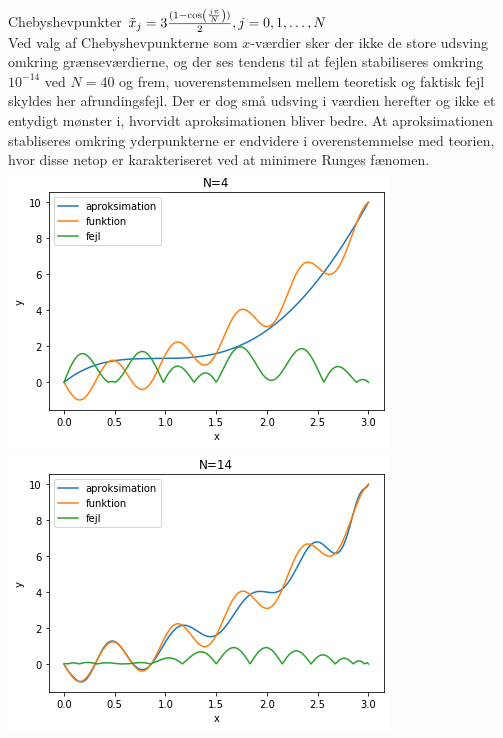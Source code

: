 
\begin{frame}{Chebyshevpunkter}
$\Tilde{x}_j = 3 \frac{(1 -\cos(\frac{j \pi}{N}))}{2}, j = 0, 1, \ldots , N$ \\
    Ved valg af Chebyshevpunkterne som $x$-værdier sker der ikke de store udsving omkring grænseværdierne, og der ses tendens til at fejlen stabiliseres omkring $10^{{-14}}$ ved $N=40$ og frem, uoverenstemmelsen mellem teoretisk og faktisk fejl skyldes her afrundingsfejl. 
    Der er dog små udsving i værdien herefter og ikke et entydigt mønster i, hvorvidt aproksimationen bliver bedre.
    At aproksimationen stabliseres omkring yderpunkterne er endvidere i overenstemmelse med teorien, hvor disse netop er karakteriseret ved at minimere Runges fænomen.
   \includegraphics[scale=0.40]{images/chev_N=4.png}
   \includegraphics[scale=0.40]{images/Chev_N=14.png}
\end{frame}